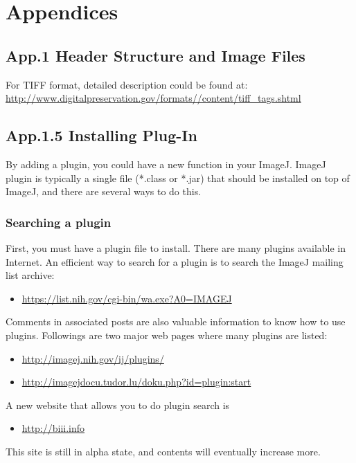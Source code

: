 
\section{Appendices}

\subsection{App.1 Header Structure and Image Files}
\label{app1}

For TIFF format, detailed description could be found at:\\
\url{http://www.digitalpreservation.gov/formats//content/tiff_tags.shtml}

\clearpage

\subsection{App.1.5 Installing Plug-In}
\label{app1.5}

By adding a plugin, you could have a new function in your ImageJ. ImageJ plugin is typically a single file (*.class or *.jar) that should be installed on top of ImageJ, and there are several ways to do this.

\subsubsection{Searching a plugin}
First, you must have a plugin file to install. There are many plugins available in Internet. An efficient way to search for a plugin is to search the ImageJ mailing list archive:

\begin{itemize}
\item \url{https://list.nih.gov/cgi-bin/wa.exe?A0=IMAGEJ}
\end{itemize}

Comments in associated posts are also valuable information to know how to use plugins. Followings are two major web pages where many plugins are listed:

\begin{itemize}
\item \url{http://imagej.nih.gov/ij/plugins/}
\item \url{http://imagejdocu.tudor.lu/doku.php?id=plugin:start}
\end{itemize}

A new website that allows you to do plugin search is
\begin{itemize}
\item \url{http://biii.info}
\end{itemize}
This site is still in alpha state, and contents will eventually increase more. 

